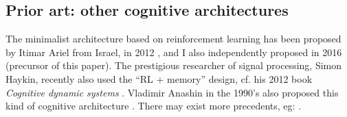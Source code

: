 \documentclass[orivec]{llncs}
\newcommand{\emp}[1]{\textbf{#1}}
\newcommand{\vect}[1]{\boldsymbol{#1}}
\begin{document}

\subsection{Prior art: other cognitive architectures}

The minimalist architecture based on reinforcement learning has been proposed by Itimar Ariel from Israel, in 2012 \cite{Arel2012}, and I also independently proposed in 2016 (precursor of this paper).  The prestigious researcher of signal processing, Simon Haykin, recently also used the ``RL + memory'' design, cf. his 2012 book \textit{Cognitive dynamic systems} \cite{Haykin2012}. Vladimir Anashin in the 1990's also proposed this kind of cognitive architecture \cite{Anashin2009}.  There may exist more precedents, eg: \cite{Ivancevic2006}.
\end{document}
